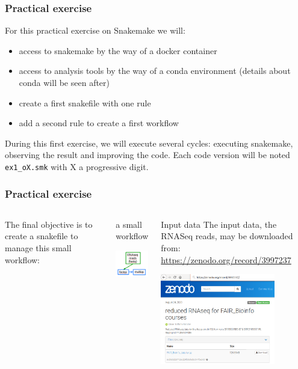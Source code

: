 \begin{frame}[containsverbatim]
\frametitle{Practical exercise}
\begin{exampleblock}{}
For this practical exercise on Snakemake we will:
\begin{itemize}
    \item access to snakemake by the way of a docker container
    \item access to analysis tools by the way of a conda environment (details about conda will be seen after)
    \item create a first snakefile with one rule
    \item add a second rule to create a first workflow
\end{itemize}
During this first exercise, we will execute several cycles: executing snakemake, observing the result and improving the code. Each code version will be noted \verb|ex1_oX.smk| with X a progressive digit.
\end{exampleblock}
\end{frame}
\begin{frame}
\frametitle{Practical exercise}
\begin{columns}
 The final objective is to create a snakefile to manage this small workflow:
   \begin{exampleblock}{a small workflow}
   \begin{center}
       \includegraphics[width=3.5cm]{03_workflow/images/FAIR_WF_2steps.png}
   \end{center}
   \end{exampleblock}

   \begin{exampleblock}{Input data}
    The input data, the RNASeq reads, may be downloaded from: \url{https://zenodo.org/record/3997237}
    \begin{center}
        \includegraphics[width=5cm]{03_workflow/images/FAIR_data_zenodo.png}
    \end{center}
   \end{exampleblock}
\end{columns}
\end{frame}
